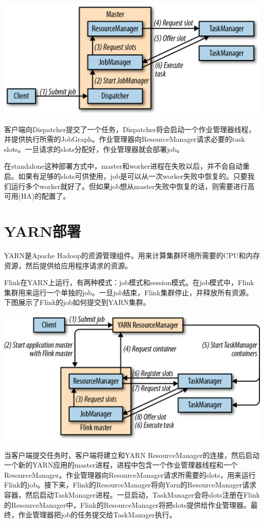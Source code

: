 \documentclass[cn,11pt,chinese]{elegantbook}
\begin{document}
\includegraphics{images/spaf_0902.png}

客户端向Dispatcher提交了一个任务，Dispatcher将会启动一个作业管理器线程，并提供执行所需的JobGraph。作业管理器向ResourceManager请求必要的task
slots。一旦请求的slots分配好，作业管理器就会部署job。

在standalone这种部署方式中，master和worker进程在失败以后，并不会自动重启。如果有足够的slots可供使用，job是可以从一次worker失败中恢复的。只要我们运行多个worker就好了。但如果job想从master失败中恢复的话，则需要进行高可用(HA)的配置了。

\hypertarget{yarnux90e8ux7f72}{%
\section{YARN部署}\label{yarnux90e8ux7f72}}

YARN是Apache
Hadoop的资源管理组件。用来计算集群环境所需要的CPU和内存资源，然后提供给应用程序请求的资源。

Flink在YARN上运行，有两种模式：job模式和session模式。在job模式中，Flink集群用来运行一个单独的job。一旦job结束，Flink集群停止，并释放所有资源。下图展示了Flink的job如何提交到YARN集群。

\includegraphics{images/spaf_0903.png}

当客户端提交任务时，客户端将建立和YARN
ResourceManager的连接，然后启动一个新的YARN应用的master进程，进程中包含一个作业管理器线程和一个ResourceManager。作业管理器向ResourceManager请求所需要的slots，用来运行Flink的job。接下来，Flink的ResourceManager将向Yarn的ResourceManager请求容器，然后启动TaskManager进程。一旦启动，TaskManager会将slots注册在Flink的ResourceManager中，Flink的ResourceManager将把slots提供给作业管理器。最终，作业管理器把job的任务提交给TaskManager执行。
\end{document}
